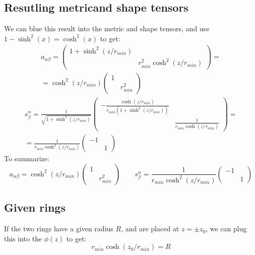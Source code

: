 \documentclass{article}
\begin{document}
\subsection{Resutling metricand shape tensors}
We can blue this result into the metric and shape tensors, and use $1 - \sinh^2(x) = \cosh^2(x)$ to get:
\begin{equation}
\begin{gathered}
    a_{\alpha\beta} = 
    \begin{pmatrix}
        1 + \sinh^2(z/r_{min}) & \\ & r_{min}^2\cosh^2(z/r_{min})
    \end{pmatrix} = \\ =
    \cosh^2(z/r_{min})
    \begin{pmatrix}
        1 & \\ & r_{min}^2
    \end{pmatrix}
\end{gathered}
\end{equation}
\begin{equation}
\begin{gathered}
    s^\alpha_\beta =
    \frac{1}{\sqrt{1 + \sinh^2(z/r_{min})}}
    \begin{pmatrix}
        -\frac{\cosh(z/r_{min})}{r_{min}\left(1 + \sinh^2(z/r_{min})\right)} & \\ & \frac{1}{r_{min}\cosh(z/r_{min})}
    \end{pmatrix} = \\ =
    \frac{1}{r_{min}\cosh^2(z/r_{min})}
    \begin{pmatrix}
        -1 & \\ & 1
    \end{pmatrix}
\end{gathered}
\end{equation}
To summarize:
\begin{equation}
    \boxed{a_{\alpha\beta} = \cosh^2(z/r_{min})
    \begin{pmatrix}
        1 & \\ & r_{min}^2
    \end{pmatrix}
    \qquad
    s^\alpha_\beta =
    \frac{1}{r_{min}\cosh^2(z/r_{min})}
    \begin{pmatrix}
        -1 & \\ & 1
    \end{pmatrix}
    }
\end{equation}
\subsection{Given rings}
If the two rings have a given radius $R$, and are placed at $z = \pm z_0$, we can plug this into the $\phi(z)$ to get:
\begin{equation}
    \boxed{r_{min}\cosh(z_0/r_{min}) = R}
\end{equation}
\end{document}
